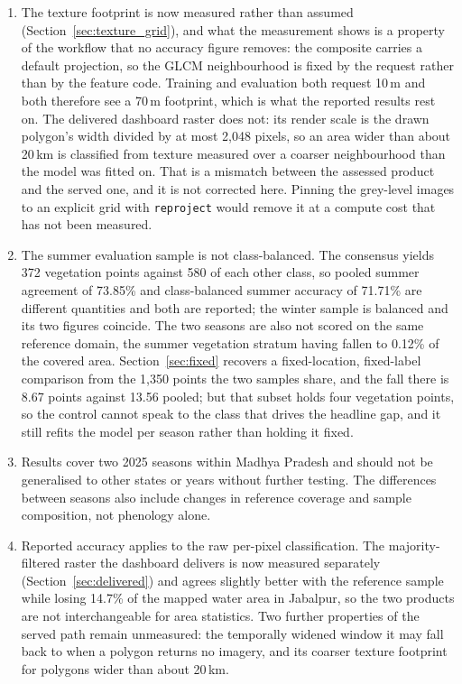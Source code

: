 \documentclass[conference]{IEEEtran}
\begin{document}
\begin{enumerate}
    \item The texture footprint is now measured rather than assumed (Section~\ref{sec:texture_grid}), and what the measurement shows is a property of the workflow that no accuracy figure removes: the composite carries a default projection, so the GLCM neighbourhood is fixed by the request rather than by the feature code. Training and evaluation both request 10\,m and both therefore see a 70\,m footprint, which is what the reported results rest on. The delivered dashboard raster does not: its render scale is the drawn polygon's width divided by at most 2,048 pixels, so an area wider than about 20\,km is classified from texture measured over a coarser neighbourhood than the model was fitted on. That is a mismatch between the assessed product and the served one, and it is not corrected here. Pinning the grey-level images to an explicit grid with \texttt{reproject} would remove it at a compute cost that has not been measured.
    \item The summer evaluation sample is not class-balanced. The consensus yields 372 vegetation points against 580 of each other class, so pooled summer agreement of 73.85\% and class-balanced summer accuracy of 71.71\% are different quantities and both are reported; the winter sample is balanced and its two figures coincide. The two seasons are also not scored on the same reference domain, the summer vegetation stratum having fallen to 0.12\% of the covered area. Section~\ref{sec:fixed} recovers a fixed-location, fixed-label comparison from the 1{,}350 points the two samples share, and the fall there is 8.67 points against 13.56 pooled; but that subset holds four vegetation points, so the control cannot speak to the class that drives the headline gap, and it still refits the model per season rather than holding it fixed.
    \item Results cover two 2025 seasons within Madhya Pradesh and should not be generalised to other states or years without further testing. The differences between seasons also include changes in reference coverage and sample composition, not phenology alone.
    \item Reported accuracy applies to the raw per-pixel classification. The majority-filtered raster the dashboard delivers is now measured separately (Section~\ref{sec:delivered}) and agrees slightly better with the reference sample while losing 14.7\% of the mapped water area in Jabalpur, so the two products are not interchangeable for area statistics. Two further properties of the served path remain unmeasured: the temporally widened window it may fall back to when a polygon returns no imagery, and its coarser texture footprint for polygons wider than about 20\,km.
\end{enumerate}
\end{document}
